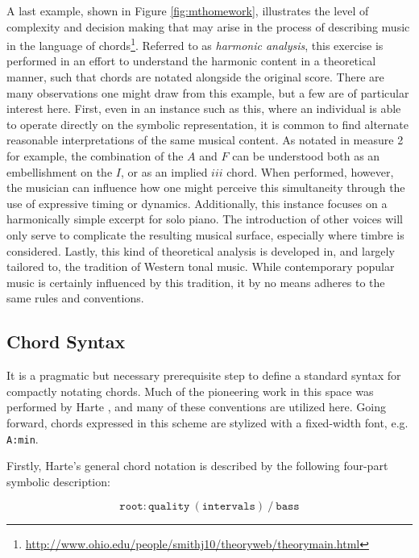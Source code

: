A last example, shown in Figure \ref{fig:mthomework}, illustrates the level of complexity and decision making that may arise in the process of describing music in the language of chords\footnote{\url{http://www.ohio.edu/people/smithj10/theoryweb/theorymain.html}}.
Referred to as \emph{harmonic analysis}, this exercise is performed in an effort to understand the harmonic content in a theoretical manner, such that chords are notated alongside the original score.
There are many observations one might draw from this example, but a few are of particular interest here.
First, even in an instance such as this, where an individual is able to operate directly on the symbolic representation, it is common to find alternate reasonable interpretations of the same musical content.
As notated in measure 2 for example, the combination of the $A$ and $F$ can be understood both as an embellishment on the $I$, or as an implied $iii$ chord.
When performed, however, the musician can influence how one might perceive this simultaneity through the use of expressive timing or dynamics.
Additionally, this instance focuses on a harmonically simple excerpt for solo piano.
The introduction of other voices will only serve to complicate the resulting musical surface, especially where timbre is considered.
Lastly, this kind of theoretical analysis is developed in, and largely tailored to, the tradition of Western tonal music.
While contemporary popular music is certainly influenced by this tradition, it by no means adheres to the same rules and conventions.


\subsection{Chord Syntax}
\label{sec:chord_syntax}

It is a pragmatic but necessary prerequisite step to define a standard syntax for compactly notating chords.
Much of the pioneering work in this space was performed by Harte \cite{Harte2005Symbolic}, and many of these conventions are utilized here.
Going forward, chords expressed in this scheme are stylized with a fixed-width font, e.g. \texttt{A:min}.

Firstly, Harte's general chord notation is described by the following four-part symbolic description:

\begin{equation}
\texttt{root}:\texttt{quality}~(\texttt{intervals})~/~\texttt{bass}
\end{equation}

